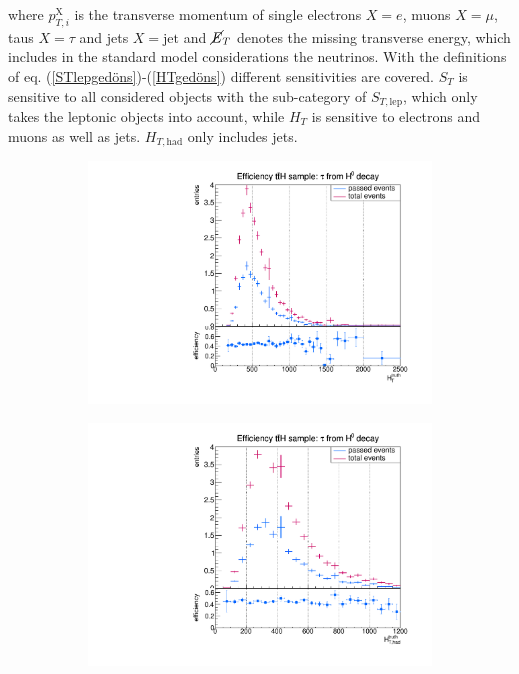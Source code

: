 where $p_{T,i}^\text{X}$ is the transverse momentum of single electrons $X=e$, muons $X=\mu$, taus $X=\tau$ and jets $X=\text{jet}$ and $\cancel{E}_{T}$ denotes the missing transverse energy, which includes in the standard model considerations the neutrinos. With the definitions of eq. (\ref{STlepgedöns})-(\ref{HTgedöns}) different sensitivities are covered. $S_T$ is sensitive to all considered objects with the sub-category of $S_{T,\text{lep}}$, which only takes the leptonic objects into account, while $H_{T}$ is sensitive to electrons and muons as well as jets. $H_{T,\text{had}}$ only includes jets.\par
%
%
\begin{figure}
  \centering
                \begin{subfigure}[t]{0.49\textwidth}
                \includegraphics[width=\textwidth]{figures/plots/ttH/Divided_fromHHT.pdf}
                \label{Divided:fromH:HT}
                \end{subfigure}
                \begin{subfigure}[t]{0.49\textwidth}
                \includegraphics[width=\textwidth]{figures/plots/ttH/Divided_fromHHThad.pdf}

\end{subfigure}
\end{figure}
